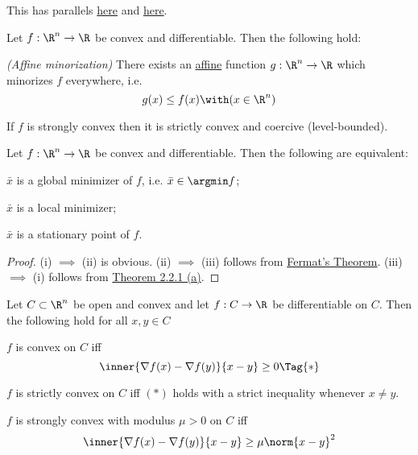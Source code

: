 This has parallels \href{a114065}{here} and \href{a8ddd0c}{here}.

\label{aa63a8a}

Let $f:\R^n\to\R$ be convex and differentiable. Then the following hold:
\begin{enumerata}
  \item \textit{(Affine minorization)} There exists an
  \href{dcb7f73}{affine} function $g:\R^n\to\R$ which minorizes
  $f$ everywhere, i.e.
  $$
    g(x)\leq f(x)\with(x\in\R^n)
  $$
  \item If $f$ is strongly convex then it is strictly convex and coercive
  (level-bounded).
\end{enumerata}

\label{f2986e2}

Let $f:\R^n\to\R$ be convex and differentiable. Then the following are
equivalent:
\begin{enumerati}
  \item $\bar x$ is a global minimizer of $f$, i.e. $\bar x\in\argmin f$;
  \item $\bar x$ is a local minimizer;
  \item $\bar x$ is a stationary point of $f$.
\end{enumerati}

\begin{proof}
  (i) $\implies$ (ii) is obvious. (ii) $\implies$ (iii) follows from
  \href{dc165c9}{Fermat's Theorem}. (iii) $\implies$ (i) follows
  from \href{cd9cea7}{Theorem 2.2.1 (a)}.
\end{proof}

\label{a8ddd0c}

Let $C\subset\R^n$ be open and convex and let $f:C\to\R$ be differentiable on
$C$. Then the following hold for all $x,y\in C$
\begin{enumerata}
  \item $f$ is convex on $C$ iff
  \begin{equation*}
    \inner{\nabla f(x)-\nabla f(y)}{x-y}\geq0\Tag{*}
  \end{equation*}
  \item $f$ is strictly convex on $C$ iff $(*)$ holds with a strict
  inequality whenever $x\neq y$.
  \item $f$ is strongly convex with modulus $\mu>0$ on $C$ iff
  $$
    \inner{\nabla f(x)-\nabla f(y)}{x-y}\geq\mu\norm{x-y}^2
  $$
\end{enumerata}

